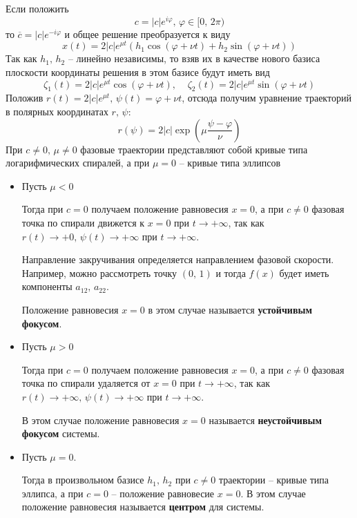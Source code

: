 \documentclass[a4paper,12pt]{article}
\renewcommand{\phi}{\ensuremath{\varphi}}
\theoremstyle{plain}
\theoremstyle{definition}
\theoremstyle{remark}
\begin{document}
\begin{enumerate}
	      Если положить
	      \[c = |c|e^{i\phi},\, \phi \in [0,\,2\pi)\]
	      то $\overline{c} = |c|e^{-i\phi}$ и общее решение преобразуется к виду
	      \[x(t) = 2|c|e^{\mu t}(h_1\cos(\phi + \nu t) + h_2\sin(\phi + \nu t))\]
	      Так как $h_1,\,h_2$ -- линейно независимы, то взяв их в качестве нового базиса плоскости координаты решения в этом базисе будут иметь вид
	      \[\zeta_1(t) = 2|c|e^{\mu t}\cos(\phi + \nu t),\;\;\;\; \zeta_2(t) = 2|c|e^{\mu t}\sin(\phi  + \nu t)\]
	      Положив $r(t) = 2|c|e^{\mu t},\, \psi(t) = \phi + \nu t$, отсюда получим уравнение траекторий в полярных координатах $r,\,\psi$:
	      \[r(\psi) = 2|c|\exp\left(\mu\frac{\psi - \phi}{\nu}\right)\]
	      При $c \neq 0,\, \mu \neq 0$ фазовые траектории представляют собой кривые типа логарифмических спиралей, а при $\mu = 0$ -- кривые типа эллипсов
	      \begin{itemize}
		      \item Пусть $\mu < 0$

		            Тогда при $c = 0$ получаем положение равновесия $x = 0$, а при $c \neq 0$ фазовая точка по спирали движется к $x = 0$ при $t \to +\infty$, так как $r(t) \to +0,\, \psi(t) \to +\infty$ при $t \to +\infty$.

		            Направление закручивания определяется направлением фазовой скорости. Например, можно рассмотреть точку $(0,\, 1)$ и тогда $f(x)$ будет иметь компоненты $a_{12},\, a_{22}$.

		            Положение равновесия $x = 0$ в этом случае называется \textbf{устойчивым фокусом}.
		      \item Пусть $\mu > 0$

		            Тогда при $c = 0$ получаем положение равновесия $x = 0$, а при $c \neq 0$ фазовая точка по спирали удаляется от $x = 0$ при $t \to +\infty$, так как $r(t) \to +\infty,\, \psi(t) \to +\infty$ при $t \to +\infty$.

		            В этом случае положение равновесия $x = 0$ называется \textbf{неустойчивым фокусом} системы.
		      \item Пусть $\mu = 0$.

		            Тогда в произвольном базисе $h_1,\,h_2$ при $c \neq 0$ траектории -- кривые типа эллипса, а при $c = 0$ -- положение равновесие $x = 0$. В этом случае положение равновесия называется \textbf{центром} для системы.
	      \end{itemize}
\end{enumerate}
\end{document}
